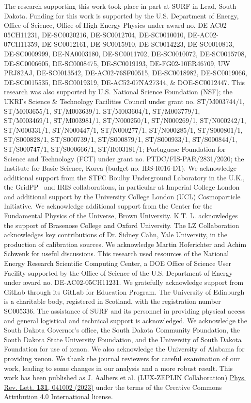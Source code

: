 \documentclass[%
 reprint,
 superscriptaddress,
 amsmath,amssymb,
 prl,
floatfix,
]{revtex4-2}
\begin{document}
The research supporting this work took place in part at SURF in Lead, South Dakota. Funding for this work is supported by the U.S. Department of Energy, Office of Science, Office of High Energy Physics under award no. DE-AC02-05CH11231, DE-SC0020216, DE-SC0012704, DE-SC0010010, DE-AC02-07CH11359, DE-SC0012161, DE-SC0015910, DE-SC0014223, DE-SC0010813, DE-SC0009999, DE-NA0003180, DE-SC0011702, DE-SC0010072, DE-SC0015708, DE-SC0006605, DE-SC0008475, DE-SC0019193, DE-FG02-10ER46709, UW PRJ82AJ, DE-SC0013542, DE-AC02-76SF00515, DE-SC0018982, DE-SC0019066, DE-SC0015535, DE-SC0019319, DE-AC52-07NA27344, \& DOE-SC0012447.	This research was also supported by U.S. National Science Foundation (NSF); the UKRI’s Science \& Technology Facilities Council under grant no. ST/M003744/1, ST/M003655/1, ST/M003639/1, ST/M003604/1, ST/M003779/1, ST/M003469/1, ST/M003981/1, ST/N000250/1, ST/N000269/1, ST/N000242/1, ST/N000331/1, ST/N000447/1, ST/N000277/1, ST/N000285/1, ST/S000801/1, ST/S000828/1, ST/S000739/1, ST/S000879/1, ST/S000933/1, ST/S000844/1, ST/S000747/1, ST/S000666/1, ST/R003181/1; Portuguese Foundation for Science and Technology (FCT) under grant no. PTDC/FIS-PAR/2831/2020; the Institute for Basic Science, Korea (budget no. IBS-R016-D1). We acknowledge additional support from the STFC Boulby Underground Laboratory in the U.K., the GridPP~\cite{faulkner2005gridpp,britton2009gridpp}  and IRIS collaborations, in particular at Imperial College London and additional support by the University College London (UCL) Cosmoparticle Initiative. We acknowledge additional support from the Center for the Fundamental Physics of the Universe, Brown University. K.T. L. acknowledges the support of Brasenose College and Oxford University. The LZ Collaboration acknowledges key contributions of Dr. Sidney Cahn, Yale University, in the production of calibration sources. We acknowledge Martin Hoferichter and Achim Schwenk for useful discussions. This research used resources of the National Energy Research Scientific Computing Center, a DOE Office of Science User Facility supported by the Office of Science of the U.S. Department of Energy under award no. DE-AC02-05CH11231. We gratefully acknowledge support from GitLab through its GitLab for Education Program. The University of Edinburgh is a charitable body, registered in Scotland, with the registration number SC005336. The assistance of SURF and its personnel in providing physical access and general logistical and technical support is acknowledged. We acknowledge the South Dakota Governor's office, the South Dakota Community Foundation, the South Dakota State University Foundation, and the University of South Dakota Foundation for use of xenon. We also acknowledge the University of Alabama for providing xenon.  We thank the journal reviewers for careful examination of our work, leading to some changes in our analysis and a more robust result. This work has been published as J. Aalbers et al. (LUX-ZEPLIN Collaboration)
\href{https://doi.org/10.1103/PhysRevLett.131.041002}{Phys. Rev. Lett. \textbf{131}, 041002 (2023)} under the terms of the Creative Commons Attribution 4.0 International license.
\end{document}
